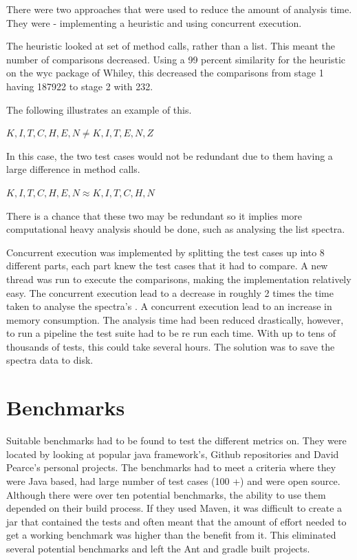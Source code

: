 There were two approaches that were used to reduce the amount of analysis time. They were - implementing a heuristic and using concurrent execution. 

The heuristic looked at set of method calls, rather than a list. This meant the number of comparisons decreased. Using a 99 percent similarity for the heuristic on the wyc package of Whiley, this decreased the comparisons from stage 1 having 187922 to stage 2 with 232. 

The following illustrates an example of this.

$K,I,T,C,H,E,N \neq K,I,T,E,N,Z $

In this case, the two test cases would not be redundant due to them having a large difference in method calls.

$K,I,T,C,H,E,N \approx K,I,T,C,H,N$

There is a chance that these two may be redundant so it implies more computational heavy analysis should be done, such as analysing the list spectra. 

Concurrent execution was implemented by splitting the test cases up into 8 different parts, each part knew the test cases that it had to compare. A new thread was run to execute the comparisons, making the implementation relatively easy. The concurrent execution lead to a decrease in roughly 2 times the time taken to analyse the spectra's . A concurrent execution lead to an increase in memory consumption.
The analysis time had been reduced drastically, however, to run a pipeline the test suite had to be re run each time. With up to tens of thousands of tests, this could take several hours. The solution was to save the spectra data to disk.

\section{Benchmarks}
\label{S:bench}
Suitable benchmarks had to be found to test the different metrics on. They were located by looking at popular java framework's, Github repositories and David Pearce's personal projects. The benchmarks had to meet a criteria where they were Java based, had large number of test cases (100 +) and were open source. Although there were over ten potential benchmarks, the ability to use them depended on their build process. If they used Maven, it was difficult to create a jar that contained the tests and often meant that the amount of effort needed to get a working benchmark was higher than the benefit from it. This eliminated several potential benchmarks and left the Ant and gradle built projects. 

